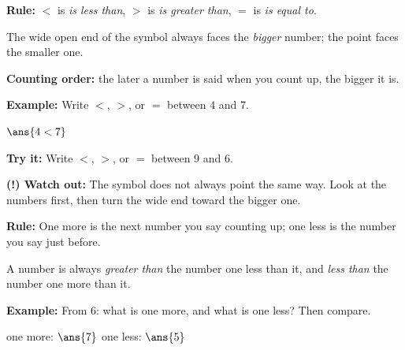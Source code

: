 \documentclass[12pt]{article}
\begin{document}


\begin{formulabox}
\textbf{Rule:} $<$ is \emph{is less than}, $>$ is \emph{is greater than}, $=$ is \emph{is equal to}.\par
The wide open end of the symbol always faces the \emph{bigger} number; the point faces the smaller one.\par
\textbf{Counting order:} the later a number is said when you count up, the bigger it is.
\end{formulabox}

\begin{examplebox}
\textbf{Example:} \quad Write $<$, $>$, or $=$ between $4$ and $7$.

$\ans{4 < 7}$
\end{examplebox}

\begin{tryitbox}
\textbf{Try it:} \quad Write $<$, $>$, or $=$ between $9$ and $6$.\\[2pt]
\end{tryitbox}

\begin{watchoutbox}
\textbf{(!) Watch out:} The symbol does not always point the same way. Look at the numbers first, then turn the wide end toward the bigger one.
\end{watchoutbox}


\begin{formulabox}
\textbf{Rule:} One more is the next number you say counting up; one less is the number you say just before.\par
A number is always \emph{greater than} the number one less than it, and \emph{less than} the number one more than it.
\end{formulabox}

\begin{examplebox}
\textbf{Example:} \quad From $6$: what is one more, and what is one less? Then compare.

one more: $\ans{7}$ \qquad one less: $\ans{5}$
\end{examplebox}
\end{document}
